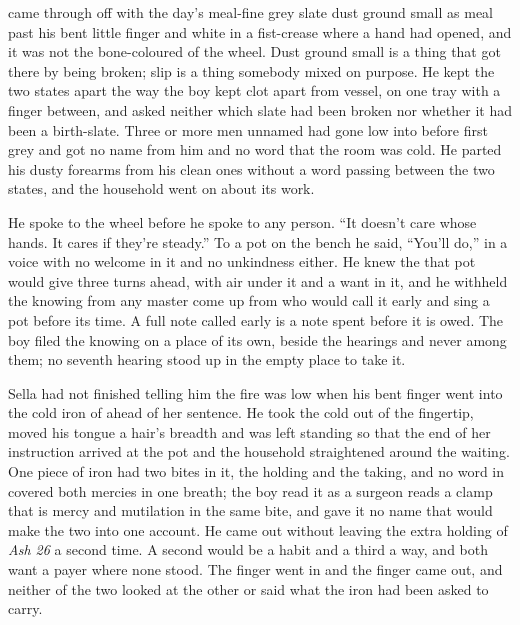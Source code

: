  came through  off  with the day's meal-fine grey slate dust ground small as meal past his bent little finger and white in a fist-crease where a hand had opened, and it was not the bone-coloured  of the wheel. Dust ground small is a thing that got there by being broken; slip is a thing somebody mixed on purpose. He kept the two states apart the way the boy kept clot apart from vessel, on one tray with a finger between, and asked neither which slate had been broken nor whether it had been a birth-slate. Three or more men unnamed had gone low into  before first grey and got no name from him and no word that the room was cold. He parted his dusty forearms from his clean ones without a word passing between the two states, and the household went on about its work.

He spoke to the wheel before he spoke to any person. “It doesn't care whose hands. It cares if they're steady.” To a pot on the bench he said, “You'll do,” in a voice with no welcome in it and no unkindness either. He knew the  that pot would give three turns ahead, with air under it and a want in it, and he withheld the knowing from any master come up from  who would call it early and sing a pot before its time. A full note called early is a note spent before it is owed. The boy filed the knowing on a place of its own, beside the hearings and never among them; no seventh hearing stood up in the empty place to take it.

Sella had not finished telling him the fire was low when his bent finger went into the cold iron of  ahead of her sentence. He took the cold out of the fingertip, moved his tongue a hair's breadth and was left standing so that the end of her instruction arrived at the pot and the household straightened around the waiting. One piece of iron had two bites in it, the holding and the taking, and no word in  covered both mercies in one breath; the boy read it as a surgeon reads a clamp that is mercy and mutilation in the same bite, and gave it no name that would make the two into one account. He came out without leaving the extra holding of \emph{Ash 26} a second time. A second would be a habit and a third a way, and both want a payer where none stood. The finger went in and the finger came out, and neither of the two looked at the other or said what the iron had been asked to carry.

